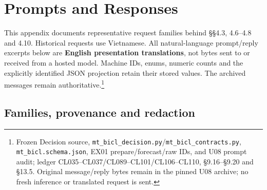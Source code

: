 \chapter{Prompts and Responses}\label{s:42c3d46ab14d3d2c}

This appendix documents representative request families behind §§4.3,
4.6--4.8 and 4.10. Historical requests use Vietnamese. All natural-language
prompt/reply excerpts below are \textbf{English presentation translations},
not bytes sent to or received from a hosted model. Machine IDs, enums,
numeric counts and the explicitly identified JSON projection retain their
stored values. The archived messages remain authoritative.\footnote{Frozen Decision source, \texttt{mt\_\allowbreak{}bicl\_\allowbreak{}decision.\allowbreak{}py}/\texttt{mt\_\allowbreak{}bicl\_\allowbreak{}contracts.\allowbreak{}py}, \texttt{mt\_\allowbreak{}bicl.\allowbreak{}schema.\allowbreak{}json}, EX01 prepare/forecast/raw IDs, and U08 prompt audit; ledger CL035--CL037/CL089--CL101/CL106--CL110, §9.16--§9.20 and §13.5. Original message/reply bytes remain in the pinned U08 archive; no fresh inference or translated request is sent.}

\section{Families, provenance and redaction}\label{s:3c1d039c39c73d45}

\begingroup
\small
{}
\setlength{\tabcolsep}{3pt}

